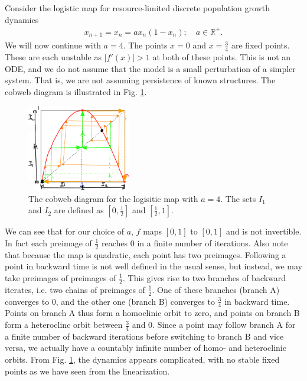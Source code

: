  \begin{ex}
 	Consider the logistic map for resource-limited discrete population growth dynamics
	\begin{align}
		x_{n+1}=x_{n}= ax_n(1-x_n);\quad a \in \mathbb{R}^{+}.
	\end{align}
	We will now continue with $a=4$. The points $x=0$ and $x=\frac{3}{4}$ are fixed points. These are each unstable as $|f'(x)|>1$ at both of these points. This is not an ODE, and we do not assume that the model is a small perturbation of a simpler system. That is, we are not assuming persistence of known structures. The cobweb diagram is illustrated in Fig. \ref{fig:logistic_cobweb}.
	\begin{figure}[h!]
		\centering
		\includegraphics[width=0.4\textwidth]{figures/ch6/23logisitic_cobweb.png}
		\caption{The cobweb diagram for the logisitic map with $a=4$. The sets $I_1$ and $I_2$ are defined as $[0, \frac{1}{2}]$ and $[\frac{1}{2}, 1]$.}
		\label{fig:logistic_cobweb}
	\end{figure}
	We can see that for our choice of $a$, $f$ maps $[0,1]$ to $[0,1]$ and is not invertible. In fact each preimage of $\frac{1}{2}$ reaches $0$ in a finite number of iterations. Also note that because the map is quadratic, each point has two preimages. Following a point in backward time is not well defined in the usual sense, but instead, we may take preimages of preimages of $\frac{1}{2}$. This gives rise to two branches of backward iterates, i.e. two chains of preimages of $\frac{1}{2}$. One of these branches (branch A) converges to 0, and the other one (branch B) converges to $\frac{3}{4}$ in backward time. Points on branch A thus form a homoclinic orbit to zero, and points on branch B form a heteroclinc orbit between $\frac{3}{4}$ and $0$. Since a point may follow branch A for a finite number of backward iterations before switching to branch B and vice versa, we actually have a countably infinite number of homo- and heteroclinic orbits. From Fig. \ref{fig:logistic_cobweb}, the dynamics appears complicated, with no stable fixed points as we have seen from the linearization.


\end{ex}
